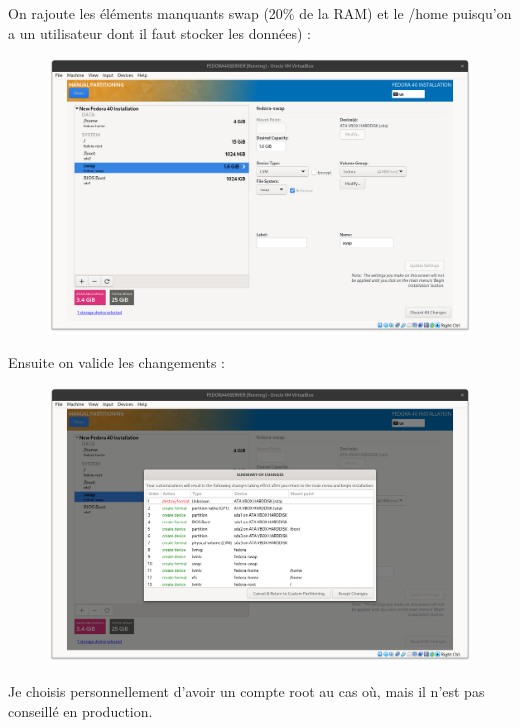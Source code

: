 \documentclass{article}
\begin{document}
 On rajoute les éléments manquants swap (20\% de la RAM) et le /home puisqu'on a un utilisateur dont il faut stocker les données) :
\begin{figure}[h!]
		\centering
		\includegraphics[width=1\textwidth]{vbox12.png}
\end{figure}

\pagebreak

Ensuite on valide les changements :

\begin{figure}[h!]
		\centering
		\includegraphics[width=1\textwidth]{vbox13.png}
\end{figure}


Je choisis personnellement d'avoir un compte root au cas où, mais il n'est pas conseillé en production.
\end{document}
